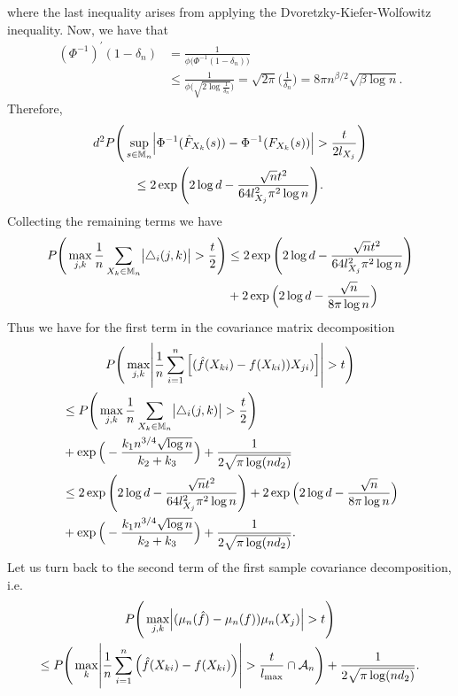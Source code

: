 where the last inequality arises from applying the Dvoretzky-Kiefer-Wolfowitz inequality. Now, we have that 
\begin{align*}
    (\Phi^{-1})^{'}(1-\delta_n) &= \frac{1}{\phi\big(\Phi^{-1}(1-\delta_n)\big)} \\
    &\leq \frac{1}{\phi\Big(\sqrt{2\log\frac{1}{\delta_n}}\Big)} = \sqrt{2\pi}\Big(\frac{1}{\delta_n}\Big) = 8\pi n^{\beta/2}\sqrt{\beta\log n}.
\end{align*}
Therefore,
\begin{multline*}
   d^2P\Bigg(\sup_{s \in \mathbb{M}_n} \abs{\Phi^{-1}(\hat{F}_{X_k}(s)) - \Phi^{-1}(F_{X_k}(s))} > \frac{t}{2l_{X_j}}\Bigg) \\
   \leq 2\exp\Bigg(2\log d - \frac{\sqrt{n}t^2}{64 l_{X_j}^2 \pi^2 \log n}\Bigg).
\end{multline*}
Collecting the remaining terms we have 
\begin{equation*}
    \begin{split}
        P\Bigg(\max_{j,k} \frac{1}{n} \sum_{X_k \in \mathbb{M}_n} \abs{\bigtriangleup_i(j,k)} > \frac{t}{2}\Bigg) %
        &\leq 2\exp\Bigg(2\log d - \frac{\sqrt{n}t^2}{64 l_{X_j}^2 \pi^2 \log n}\Bigg) \\
        &+ 2\exp\Big(2\log d - \frac{\sqrt{n}}{8\pi\log n}\Big)
    \end{split}
\end{equation*}
Thus we have for the first term in the covariance matrix decomposition
\begin{multline*}
        P\Bigg(\max_{j,k}\abs{\frac{1}{n}\sum_{i=1}^n \Big[(\hat{f}(X_{ki}) - f(X_{ki}))X_{ji})\Big]} > t \Bigg) \\
        \begin{aligned}
        &\leq P\Bigg(\max_{j,k} \frac{1}{n} \sum_{X_k \in \mathbb{M}_n} \abs{\bigtriangleup_i(j,k)} > \frac{t}{2}\Bigg) \\
        &+ \exp\Big(- \frac{k_1 n^{3/4} \sqrt{\log n}}{k_2+ k_3} \Big) + \frac{1}{2\sqrt{\pi \log(nd_2)}} \\
        &\leq 2\exp\Bigg(2\log d - \frac{\sqrt{n}t^2}{64 l_{X_j}^2 \pi^2 \log n}\Bigg) + 2\exp\Big(2\log d - \frac{\sqrt{n}}{8\pi\log n}\Big) \\
        &+ \exp\Big(- \frac{k_1 n^{3/4} \sqrt{\log n}}{k_2+ k_3} \Big) + \frac{1}{2\sqrt{\pi \log(nd_2)}}.
        \end{aligned}
\end{multline*}
Let us turn back to the second term of the first sample covariance decomposition, i.e. 
\begin{multline*}
    P\Bigg(\max_{j,k}\abs{(\mu_n(\hat{f}) - \mu_n(f))\mu_n(X_j)} > t \Bigg) \\
    \leq P\Bigg(\max_{k}\abs{ \frac{1}{n}\sum_{i=1}^n \left(\hat{f}(X_{ki}) - f(X_{ki})\right)} > \frac{t}{l_{\max}} \cap \mathcal{A}_n \Bigg) + \frac{1}{2\sqrt{\pi \log(nd_2)}}.
\end{multline*}
